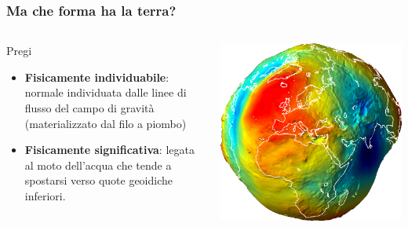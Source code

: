 \documentclass{beamer}
\begin{document}
{\begin{frame}
\end{frame}

\begin{frame}
    \frametitle{Ma che forma ha la terra?}

    \begin{columns}
        \begin{column}{0.5\textwidth}
            \begin{block}{Pregi}
                {\small \begin{itemize}
                    \item[\checkmark] \textbf{Fisicamente individuabile}: normale individuata dalle linee
                    di flusso del campo di gravità (materializzato dal filo a piombo)
                    \item[\checkmark] \textbf{Fisicamente significativa}: legata al moto dell'acqua
                    che tende a spostarsi verso quote geoidiche inferiori.
                \end{itemize}}
           \end{block}
        \end{column}
        \begin{column}{0.5\textwidth}
            \begin{center}
        		\includegraphics[width=\textwidth] {./pics/geoide.png}	
        	\end{center} 
        \end{column}
        

\end{columns}
\end{frame}}
\end{document}
